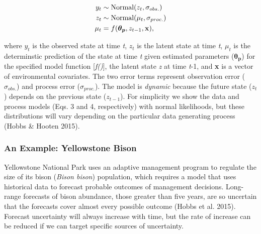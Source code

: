 \documentclass[12pt,]{article}
\begin{document}
\begin{align}
y_t &\sim \text{Normal}(z_t, \sigma_{obs.}) \\
z_t &\sim \text{Normal}(\mu_t, \sigma_{proc.}) \\
\mu_t &= f(\boldsymbol{\theta_p},z_{t-1},\bold{x}),
\end{align}\vspace{-2em}

where \(y_t\) is the observed state at time \emph{t}, \(z_t\) is the
latent state at time \emph{t}, \(\mu_t\) is the determinstic prediction
of the state at time \emph{t} given estimated parameters
(\(\boldsymbol{\theta_p}\)) for the specified model function
{[}\emph{f()}{]}, the latent state \emph{z} at time \emph{t}-1, and
\textbf{x} is a vector of environmental covariates. The two error terms
represent observation error (\(\sigma_{obs.}\)) and process error
(\(\sigma_{proc.}\)). The model is \emph{dynamic} because the future
state (\(z_t\)) depends on the previous state (\(z_{t-1}\)). For
simplicity we show the data and process models (Eqs. 3 and 4,
respectively) with normal likelihoods, but these distributions will vary
depending on the particular data generating process (Hobbs \& Hooten
2015).

\subsubsection{An Example: Yellowstone Bison}

Yellowstone National Park uses an adaptive management program to
regulate the size of its bison (\emph{Bison bison}) population, which
requires a model that uses historical data to forecast probable outcomes
of management decisions. Long-range forecasts of bison abundance, those
greater than five years, are so uncertain that the forecasts cover
almost every possible outcome (Hobbs et al. 2015). Forecast uncertainty
will always increase with time, but the rate of increase can be reduced
if we can target specific sources of uncertainty.
\end{document}
